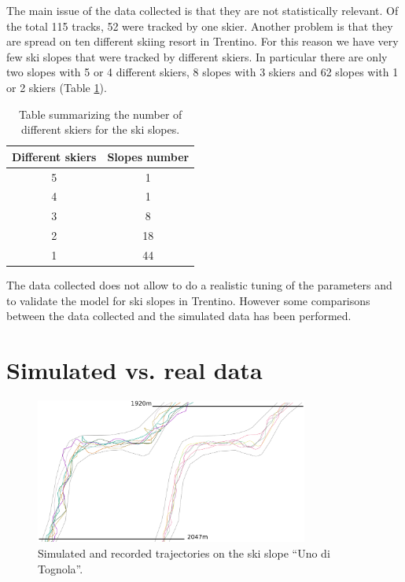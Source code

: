 \documentclass[12pt,a4paper,twoside]{book}
\begin{document}
The main issue of the data collected is that they are not statistically relevant. Of the total 115 tracks, 52 were tracked by one skier. Another problem is that they are spread on ten different skiing resort in Trentino. For this reason we have very few ski slopes that were tracked by different skiers. In particular there are only two slopes with 5 or 4 different skiers, 8 slopes with 3 skiers and 62 slopes with 1 or 2 skiers (Table \ref{slopes}).

\begin{table}[!h]
  \centering
  \begin{tabular}{ | c | c | }
    \hline
    Different skiers & Slopes number \\
    \hline
    5 & 1 \\
    4 & 1 \\
    3 & 8 \\
    2 & 18 \\
    1 & 44 \\
    \hline
  \end{tabular}
  \caption{Table summarizing the number of different skiers for the ski slopes.}
  \label{slopes}
\end{table}

The data collected does not allow to do a realistic tuning of the parameters and to validate the model for ski slopes in Trentino. However some comparisons between the data collected and the simulated data has been performed.

\section{Simulated vs. real data}
\begin{figure}[!h]
  \centering
    \includegraphics[width=0.8\textwidth]{images/traiettorie.eps}
    \caption{Simulated and recorded trajectories on the ski slope ``Uno di Tognola''.}\label{traj}
\end{figure}
\end{document}
